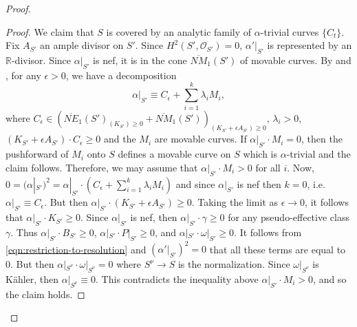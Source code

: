 \documentclass[12pt]{amsart}
\theoremstyle{plain}
\theoremstyle{remark}
\theoremstyle{definition}
\newcommand{\<}{\leq}
\newcommand{\mbR}{\mathbb{R}}
\def\mcO{\mathcal{O}}
\def\mcO{\mathcal{O}}
\theoremstyle{definition}
\theoremstyle{definition}
\numberwithin{equation}{section}
\theoremstyle{remark}
\begin{document}
\begin{proof}
\begin{proof}
    We claim that $S$ is covered by an analytic family of $\alpha$-trivial curves $\{C_t\}$.
    Fix $A_{S'}$ an ample divisor on $S'$. Since $H^2(S', \mcO_{S'})=0$, $\alpha'|_{S'}$ is represented by an $\mbR$-divisor. 
    Since $\alpha |_{S'}$ is nef, it is in the cone $\overline {NM}_1(S')$ of movable curves. By \cite[Theorem 1.3]{Ara10} and \cite[Theorem 1.9]{Das20}, for any $\epsilon >0$, we have
a decomposition \[\alpha |_{S'}\equiv C_{\epsilon}+\sum _{i=1}^k\lambda _iM_i,\]
where $C_{\epsilon}\in (\overline{NE}_1(S')_{(K_{S'})\geq 0}+\overline {NM}_1(S'))_{(K_{S'}+\epsilon A_{S'})\geq 0}$, $\lambda _i>0$, $(K_{S'}+\epsilon A_{S'})\cdot C_{\epsilon}\geq 0$ and the $M_i$ are movable curves. If $\alpha |_{S'}\cdot M_i=0$, then the pushforward of $M_i$ onto $S$ defines a movable curve on $S$ which is $\alpha$-trivial and the claim follows. Therefore, we may assume that $\alpha |_{S'}\cdot M_i>0$ for all $i$.
Now, $0=(\alpha |_{S'})^2=\alpha |_{S'}\cdot (C_{\epsilon}+\sum _{i=1}^k\lambda _iM_i)$ and since $\alpha |_{S'}$ is nef then $k=0$, i.e. $\alpha |_{S'}\equiv C_{\epsilon}$. But then $\alpha |_{S'}\cdot (K_{S'}+\epsilon A_{S'})\geq 0$. Taking the limit as $\epsilon \to 0$, it follows that
$\alpha |_{S'}\cdot K_{S'}\geq 0$. Since $\alpha |_{S'}$ is nef, then $\alpha |_{S'}\cdot \gamma\geq 0$ for any pseudo-effective class $\gamma$. Thus $\alpha |_{S'}\cdot B_{S'}\geq 0$, $\alpha |_{S'}\cdot P|_{S'}\geq 0$, and $\alpha |_{S'}\cdot \omega |_{S'}\geq 0$. It follows from \eqref{eqn:restriction-to-resolution} and $(\alpha'|_{S'})^2=0$ that all these terms are equal to $0$. But then $\alpha |_{S^\nu}\cdot \omega |_{S^\nu}=0$ where $S^\nu\to S$ is the normalization. Since $\omega |_{S^\nu}$ is K\"ahler, then $\alpha |_{S^\nu}\equiv 0$. This contradicts the inequality above $\alpha |_{S'}\cdot M_i>0$, and so the claim holds.
   

\end{proof}
\end{proof}
\end{document}
